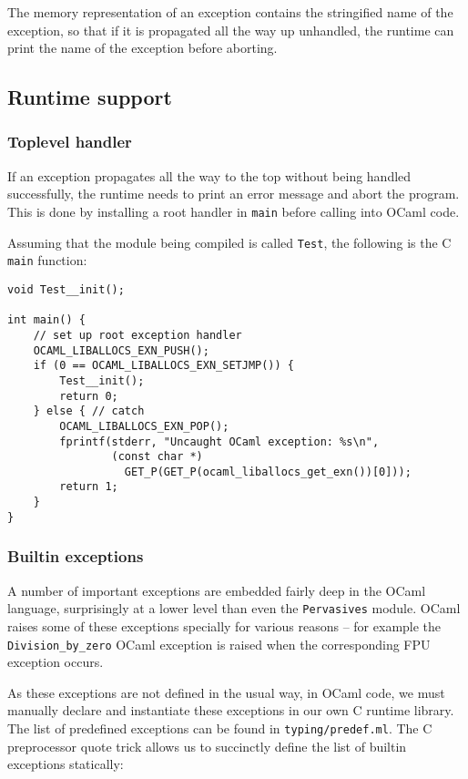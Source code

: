 \documentclass[12pt,a4paper,twoside,openright]{report}
\begin{document}
The memory representation of an exception contains the stringified name of the
exception, so that if it is propagated all the way up unhandled, the runtime
can print the name of the exception before aborting.

\subsection{Runtime support}

\subsubsection{Toplevel handler}

If an exception propagates all the way to the top without being handled
successfully, the runtime needs to print an error message and abort the
program. This is done by installing a root handler in \lstinline!main! before
calling into OCaml code.

Assuming that the module being compiled is called \lstinline!Test!, the
following is the C \lstinline!main! function:

\begin{lstlisting}
void Test__init();

int main() {
    // set up root exception handler
    OCAML_LIBALLOCS_EXN_PUSH();
    if (0 == OCAML_LIBALLOCS_EXN_SETJMP()) {
        Test__init();
        return 0;
    } else { // catch
        OCAML_LIBALLOCS_EXN_POP();
        fprintf(stderr, "Uncaught OCaml exception: %s\n",
                (const char *)
                  GET_P(GET_P(ocaml_liballocs_get_exn())[0]));
        return 1;
    }
}
\end{lstlisting}

\subsubsection{Builtin exceptions}

A number of important exceptions are embedded fairly deep in the OCaml
language, surprisingly at a lower level than even the \lstinline!Pervasives!
module. OCaml raises some of these exceptions specially for various reasons --
for example the \lstinline!Division_by_zero! OCaml exception is raised when the
corresponding FPU exception occurs.

As these exceptions are not defined in the usual way, in OCaml code, we must
manually declare and instantiate these exceptions in our own C runtime library.
The list of predefined exceptions can be found in \lstinline!typing/predef.ml!.
The C preprocessor quote trick allows us to succinctly define the list of
builtin exceptions statically:
\end{document}
